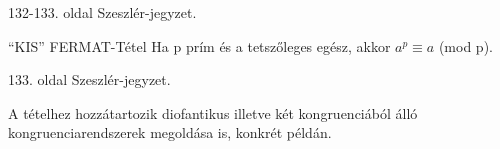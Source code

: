 \begin{bizonyitas}{}
132-133. oldal Szeszlér-jegyzet.
\end{bizonyitas}

\begin{tetel}{``KIS'' FERMAT-Tétel}
Ha p prím és a tetszőleges egész, akkor $a^p \equiv a$ (mod p).
\end{tetel}

\begin{bizonyitas}{}
133. oldal Szeszlér-jegyzet.
\end{bizonyitas}

A tételhez hozzátartozik diofantikus illetve két kongruenciából álló kongruenciarendszerek megoldása is, konkrét példán.
